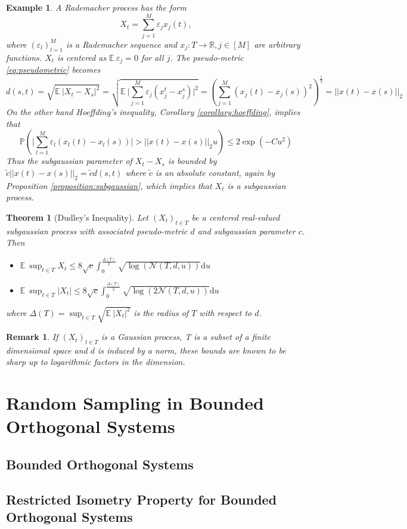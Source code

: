 \documentclass[10pt,a4paper]{article}
\theoremstyle{thmstyle}
\newtheorem{theorem}{Theorem}
\newtheorem{example}{Example}
\newtheorem{remark}{Remark}
\newcommand{\E}{\mathbb{E}~}
\renewcommand{\Pr}[1]{\mathbb{P}\left( #1 \right)}
\begin{document}
\begin{example}
  A \emph{Rademacher process} has the form
  \begin{equation*}
    X_{t} = \sum_{j = 1}^{M} \varepsilon_{j} x_{j}(t),
  \end{equation*}
  where $(\varepsilon_{l})_{l = 1}^{M}$ is a Rademacher sequence and $x_{j} : T \rightarrow \mathbb{R}, j \in [M]$ are arbitrary functions.
  $X_t$ is centered as $\E \varepsilon_{j} = 0$ for all $j$.
  The pseudo-metric \eqref{eq:pseudometric} becomes
  \begin{equation*}
    d(s, t) = \sqrt{\E |X_{t} - X_{s}|^{2}} = \sqrt{\E \Big| \sum_{j = 1}^{M} \varepsilon_{j} (x_{j}^{t} - x_{j}^{s}) \Big|^{2}} = \left( \sum_{j = 1}^{M} \left( x_{j}(t) - x_{j}(s) \right)^{2} \right)^{\frac{1}{2}} = ||x(t) - x(s)||_{2}
  \end{equation*}
  On the other hand Hoeffding's inequality, Corollary \ref{corollary:hoeffding}, implies that
  \begin{equation*}
    \Pr{\Big| \sum_{l = 1}^{M} \varepsilon_{l} (x_{l}(t) - x_{l}(s)) \Big| > ||x(t) - x(s)||_{2} u} \le 2\exp(-Cu^{2})
  \end{equation*}
  Thus the subgaussian parameter of $X_{t} - X_{s}$ is bounded by $\tilde{c}||x(t) - x(s)||_{2} = \tilde{c}d(s, t)$ where $\tilde{c}$ is an absolute constant, again by Proposition \ref{proposition:subgaussian}, which implies that $X_{t}$ is a subgaussian process.
\end{example}

\begin{theorem}[Dudley's Inequality]
  Let $(X_{t})_{t \in T}$ be a centered real-valued subgaussian process with associated pseudo-metric $d$ and subgaussian parameter $c$.
  Then
  \begin{itemize}
  \item $\E \sup_{t \in T} X_{t} \le 8\sqrt{c} \int_{0}^{\frac{\Delta(T)}{2}} \sqrt{\log(\mathcal{N}(T, d, u))} \mathrm{d}u$
  \item $\E \sup_{t \in T} |X_{t}| \le 8\sqrt{c} \int_{0}^{\frac{\Delta(T)}{2}} \sqrt{\log(2\mathcal{N}(T, d, u))} \mathrm{d}u$
  \end{itemize}
  where $\Delta(T) = \sup_{t \in T} \sqrt{\E |X_{t}|^{2}}$ is the radius of $T$ with respect to $d$.
\end{theorem}

\begin{remark}
  If $(X_{t})_{t \in T}$ is a Gaussian process, T is a subset of a finite dimensional space and $d$ is induced by a norm, these bounds are known to be sharp up to logarithmic factors in the dimension.
\end{remark}

\section{Random Sampling in Bounded Orthogonal Systems}

\subsection{Bounded Orthogonal Systems}

\subsection{Restricted Isometry Property for Bounded Orthogonal Systems}
\end{document}
